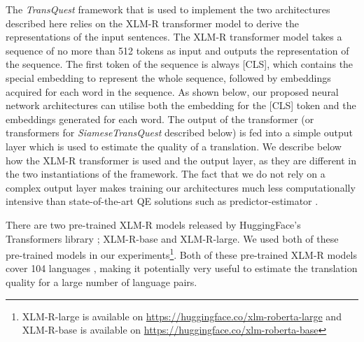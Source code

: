 The \textit{TransQuest} framework that is used to implement the two architectures described here relies on the XLM-R transformer model \autocite{conneau-etal-2020-unsupervised} to derive the representations of the input sentences. The XLM-R transformer model takes a sequence of no more than 512 tokens as input and outputs the representation of the sequence. The first token of the sequence is always \textsc{[CLS]}, which contains the special embedding to represent the whole sequence, followed by embeddings acquired for each word in the sequence. As shown below, our proposed neural network architectures can utilise both the embedding for the \textsc{[CLS]} token and the embeddings generated for each word. The output of the transformer (or transformers for \textit{SiameseTransQuest} described below) is fed into a simple output layer which is used to estimate the quality of a translation. We describe below how the XLM-R transformer is used and the output layer, as they are different in the two instantiations of the framework. The fact that we do not rely on a complex output layer makes training our architectures much less computationally intensive than state-of-the-art QE solutions such as predictor-estimator \autocite{lee-2020-two, wang-etal-2018-alibaba}.

There are two pre-trained XLM-R models released by HuggingFace's Transformers library \autocite{wolf-etal-2020-transformers}; XLM-R-base and XLM-R-large. We used both of these pre-trained models in our experiments\footnote{XLM-R-large is available on \url{https://huggingface.co/xlm-roberta-large} and XLM-R-base is available on \url{https://huggingface.co/xlm-roberta-base}}. Both of these pre-trained XLM-R models cover 104 languages \autocite{conneau-etal-2020-unsupervised}, making it potentially very useful to estimate the translation quality for a large number of language pairs.


